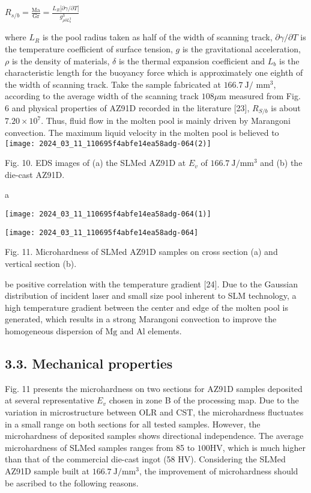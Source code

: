 \documentclass[10pt]{article}
\begin{document}
$R_{s / b}=\frac{\mathrm{Ma}}{\mathrm{Gr}}=\frac{L_{R}|\partial \gamma / \partial T|}{g_{\rho \delta L_{b}^{3}}^{3}}$

where $L_{R}$ is the pool radius taken as half of the width of scanning track, $\partial \gamma / \partial T$ is the temperature coefficient of surface tension, $g$ is the gravitational acceleration, $\rho$ is the density of materials, $\delta$ is the thermal expansion coefficient and $L_{b}$ is the characteristic length for the buoyancy force which is approximately one eighth of the width of scanning track. Take the sample fabricated at $166.7 \mathrm{~J} /$ $\mathrm{mm}^{3}$, according to the average width of the scanning track $108 \mu \mathrm{m}$ measured from Fig. 6 and physical properties of AZ91D recorded in the literature [23], $R_{S / b}$ is about $7.20 \times 10^{7}$. Thus, fluid flow in the molten pool is mainly driven by Marangoni convection. The maximum liquid velocity in the molten pool is believed to\\
\texttt{[image: 2024\_03\_11\_110695f4abfe14ea58adg-064(2)]}

Fig. 10. EDS images of (a) the SLMed AZ91D at $E_{v}$ of $166.7 \mathrm{~J} / \mathrm{mm}^{3}$ and (b) the die-cast AZ91D.

a

\begin{center}
\texttt{[image: 2024\_03\_11\_110695f4abfe14ea58adg-064(1)]}
\end{center}

\begin{center}
\texttt{[image: 2024\_03\_11\_110695f4abfe14ea58adg-064]}
\end{center}

Fig. 11. Microhardness of SLMed AZ91D samples on cross section (a) and vertical section (b).

be positive correlation with the temperature gradient [24]. Due to the Gaussian distribution of incident laser and small size pool inherent to SLM technology, a high temperature gradient between the center and edge of the molten pool is generated, which results in a strong Marangoni convection to improve the homogeneous dispersion of $\mathrm{Mg}$ and $\mathrm{Al}$ elements.

\subsection*{3.3. Mechanical properties}
Fig. 11 presents the microhardness on two sections for AZ91D samples deposited at several representative $E_{v}$ chosen in zone B of the processing map. Due to the variation in microstructure between OLR and CST, the microhardness fluctuates in a small range on both sections for all tested samples. However, the microhardness of deposited samples shows directional independence. The average microhardness of SLMed samples ranges from 85 to $100 \mathrm{HV}$, which is much higher than that of the commercial die-cast ingot (58 HV). Considering the SLMed AZ91D sample built at $166.7 \mathrm{~J} / \mathrm{mm}^{3}$, the improvement of microhardness should be ascribed to the following reasons.
\end{document}
